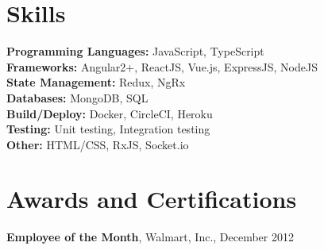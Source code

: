 \documentclass[10pt, letterpaper]{article}
\begin{document}
 \section*{Skills}
 \textbf{Programming Languages:} JavaScript, TypeScript \\
 \textbf{Frameworks:} Angular2+, ReactJS, Vue.js, ExpressJS, NodeJS \\
 \textbf{State Management:} Redux, NgRx \\
 \textbf{Databases:} MongoDB, SQL \\
 \textbf{Build/Deploy:} Docker, CircleCI, Heroku \\
 \textbf{Testing:} Unit testing, Integration testing \\
 \textbf{Other:} HTML/CSS, RxJS, Socket.io

 \section*{Awards and Certifications}
 \textbf{Employee of the Month}, Walmart, Inc., December 2012
\end{document}
